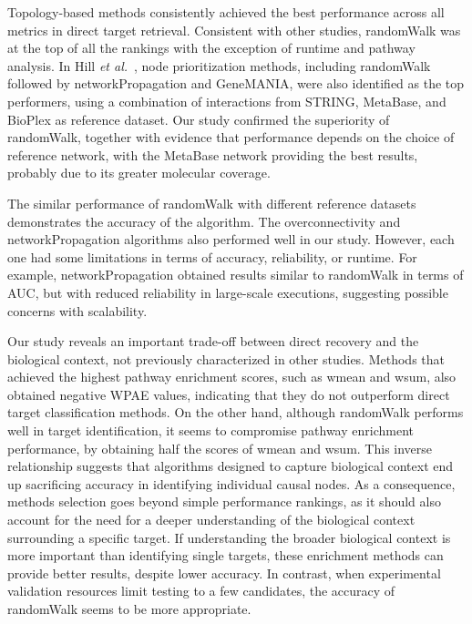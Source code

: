 Topology-based methods consistently achieved the best performance across all metrics in direct target retrieval. 
Consistent with other studies, randomWalk was at the top of all the rankings with the exception of runtime and pathway analysis.
In Hill \textit{et al.}~\cite{RN37}, node prioritization methods, including randomWalk followed by networkPropagation and GeneMANIA, were also identified as the top performers, using a combination of interactions from STRING, MetaBase, and BioPlex as reference dataset. 
Our study confirmed the superiority of randomWalk, together with evidence that performance depends on the choice of reference network, with the MetaBase network providing the best results, probably due to its greater molecular coverage.

The similar performance of randomWalk with different reference datasets demonstrates the accuracy of the algorithm. 
The overconnectivity and networkPropagation algorithms also performed well in our study. 
However, each one had some limitations in terms of accuracy, reliability, or runtime. 
For example, networkPropagation obtained results similar to randomWalk in terms of \gls{AUC}, but with reduced reliability in large-scale executions, suggesting possible concerns with scalability.

Our study reveals an important trade-off between direct recovery and the biological context, not previously characterized in other studies. 
Methods that achieved the highest pathway enrichment scores, such as wmean and wsum, also obtained negative \gls{WPAE} values, indicating that they do not outperform direct target classification methods. 
On the other hand, although randomWalk performs well in target identification, it seems to compromise pathway enrichment performance, by obtaining half the scores of wmean and wsum. 
This inverse relationship suggests that algorithms designed to capture biological context end up sacrificing accuracy in identifying individual causal nodes. 
As a consequence, methods selection goes beyond simple performance rankings, as it should also account for the need for a deeper understanding of the biological context surrounding a specific target. 
If understanding the broader biological context is more important than identifying single targets, these enrichment methods can provide better results, despite lower accuracy. 
In contrast, when experimental validation resources limit testing to a few candidates, the accuracy of randomWalk seems to be more appropriate.

